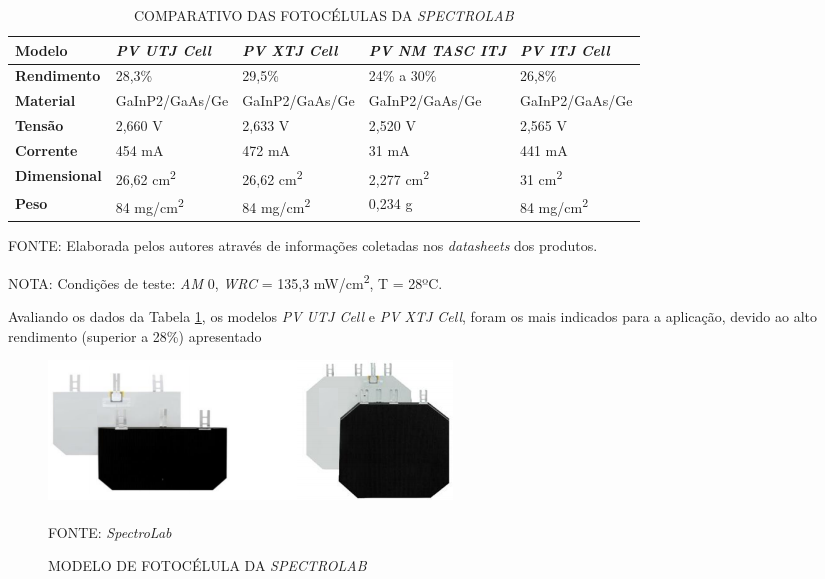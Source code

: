\documentclass[
	12pt,				%
	openright,			%
	oneside,			%
	a4paper,			%
	english,			%
	french,				%
	spanish,			%
	brazil,				%
	oldfontcommands
	]{abntex2}
\begin{document}
	\begin{table}[th]
	\caption{COMPARATIVO DAS FOTOCÉLULAS DA \textit{SPECTROLAB}}
	\label{Tab_Spectro_Comp}
	\begin{tabular}{p{2.5cm}|p{3.1cm}|p{3.1cm}|p{3.1cm}|p{3.1cm}}
		\textbf{Modelo} & \textit{\textbf{PV UTJ Cell}} & \textit{\textbf{PV XTJ Cell}} & \textit{\textbf{PV NM TASC ITJ}} & \textit{\textbf{PV ITJ Cell}} \\
		\hline
		\textbf{Rendimento} & 28,3\% & 29,5\% & 24\% a 30\% & 26,8\% \\
		\hline
		\textbf{Material} & GaInP2/GaAs/Ge & GaInP2/GaAs/Ge & GaInP2/GaAs/Ge & GaInP2/GaAs/Ge\\
		\hline
		\textbf{Tensão} & 2,660 V & 2,633 V & 2,520 V & 2,565 V\\
		\hline
		\textbf{Corrente} & 454 mA & 472 mA & 31 mA & 441 mA\\
		\hline
		\textbf{Dimensional} & 26,62 cm\textsuperscript{2} & 26,62 cm\textsuperscript{2} & 2,277 cm\textsuperscript{2} & 31 cm\textsuperscript{2}\\
		\hline
		\textbf{Peso} & 84 mg/cm\textsuperscript{2} & 84 mg/cm\textsuperscript{2} & 0,234 g & 84 mg/cm\textsuperscript{2}\\
	\end{tabular}
	
	\begin{small}
	\vspace{3pt}
		FONTE: Elaborada pelos autores através de informações coletadas nos \textit{datasheets} dos produtos.
	\end{small}
	\begin{footnotesize}
		NOTA: Condições de teste: \textit{AM} 0, \textit{WRC} = 135,3 mW/cm\textsuperscript{2}, T = 28ºC.
	\end{footnotesize}
	\end{table}

	Avaliando os dados da Tabela \ref{Tab_Spectro_Comp}, os modelos \textit{PV UTJ Cell} e \textit{PV XTJ Cell}, foram os mais indicados para a aplicação, devido ao alto rendimento (superior a 28\%) apresentado
	
	\begin{figure}[th]
		\caption{MODELO DE FOTOCÉLULA DA \textit{SPECTROLAB}}
		\label{Fig_Cell_Spectro}
		\centering
		\includegraphics[width=1.0\linewidth]{./figs/UTJ}
			
		\begin{small}
			FONTE: \textit{SpectroLab}\textsuperscript{\cite{SpectroLab2}}
		\end{small}		
	\end{figure}
\end{document}
